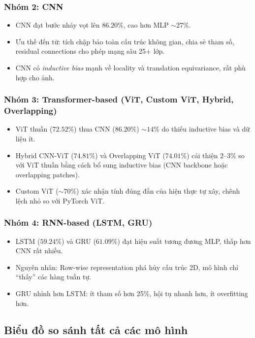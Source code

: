 \documentclass[a4paper]{article}
\theoremstyle{definition}
\begin{document}
\subsubsection{Nhóm 2: CNN}
\begin{itemize}
	\item CNN đạt bước nhảy vọt lên $86.20\%$, cao hơn MLP $\sim 27\%$.
	\item Ưu thế đến từ: tích chập bảo toàn cấu trúc không gian, chia sẻ tham số, residual connections cho phép mạng sâu 25+ lớp.
	\item CNN có \textit{inductive bias} mạnh về locality và translation equivariance, rất phù hợp cho ảnh.
\end{itemize}

\subsubsection{Nhóm 3: Transformer-based (ViT, Custom ViT, Hybrid, Overlapping)}
\begin{itemize}
	\item ViT thuần ($72.52\%$) thua CNN ($86.20\%$) $\sim 14\%$ do thiếu inductive bias và dữ liệu ít.
	\item Hybrid CNN-ViT ($74.81\%$) và Overlapping ViT ($74.01\%$) cải thiện $2$--$3\%$ so với ViT thuần bằng cách bổ sung inductive bias (CNN backbone hoặc overlapping patches).
	\item Custom ViT ($\sim 70\%$) xác nhận tính đúng đắn của hiện thực tự xây, chênh lệch nhỏ so với PyTorch ViT.
\end{itemize}

\subsubsection{Nhóm 4: RNN-based (LSTM, GRU)}
\begin{itemize}
	\item LSTM ($59.24\%$) và GRU ($61.09\%$) đạt hiệu suất tương đương MLP, thấp hơn CNN rất nhiều.
	\item Nguyên nhân: Row-wise representation phá hủy cấu trúc 2D, mô hình chỉ ``thấy'' các hàng tuần tự.
	\item GRU nhỉnh hơn LSTM: ít tham số hơn 25\%, hội tụ nhanh hơn, ít overfitting hơn.
\end{itemize}

\subsection{Biểu đồ so sánh tất cả các mô hình}
\end{document}
